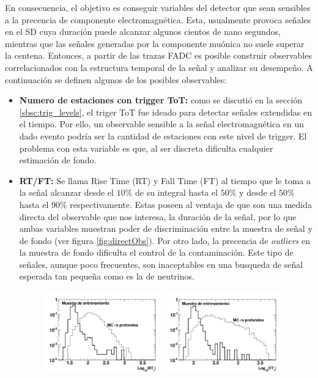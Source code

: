 	En consecuencia, el objetivo es conseguir variables del detector que sean sensibles a la precencia de componente electromagnética.
	Esta, usualmente provoca señales en el SD cuya duración puede alcanzar algunos cientos de nano segundos, mientras que las señales generadas por la componente muónica no suele superar la centena.
	Entonces, a partir de las trazas FADC es posible construir observables correlacionados con la estructura temporal de la señal y analizar su desempeño.
	A continuación se definen algunos de los posibles observables:
	\begin{itemize}
	 \item \textbf{Numero de estaciones con trigger ToT:} como se discutió en la sección \ref{sbsc:trig_levels}, el triger ToT fue ideado para detectar señales extendidas en el tiempo.
	 Por ello, un observable sensible a la señal electromagnética en un dado evento podría ser la cantidad de estaciones con este nivel de trigger.
	 El problema con esta variable es que, al ser discreta dificulta cualquier estimación de fondo.
	 \item \textbf{RT/FT:} Se llama Rise Time (RT) y Fall Time (FT) al tiempo que le toma a la señal alcanzar desde el $10\%$ de su integral hasta el $50\%$ y desde el $50\%$ hasta el $90\%$ respectivamente.
	 Estas poseen al ventaja de que son una medida directa del observable que nos interesa, la duración de la señal, por lo que ambas variables muestran poder de discriminación entre la muestra de señal y de fondo (ver figura \ref{fig:directObs}).
	 Por otro lado, la precencia de \emph{outliers} en la muestra de fondo dificulta el control de la contaminación.
	 Este tipo de señales, aunque poco frecuentes, son inaceptables en una busqueda de señal esperada tan pequeña como es la de neutrinos.
	 \begin{figure}[ht!]
		\begin{center}
		\includegraphics[width=0.48\textwidth]{fig/seleccionAuger/rt1}
		\hfill
		\includegraphics[width=0.48\textwidth]{fig/seleccionAuger/ft1}

\end{center}
\end{figure}
\end{itemize}
